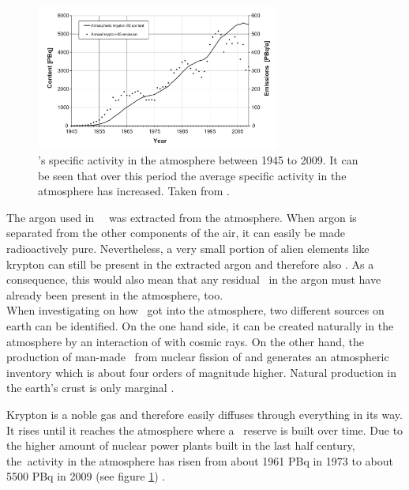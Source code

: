 \documentclass[encoding=utf8,british]{tumphthesis}
\begin{document}
\begin{figure}[t!]
	\centering
	\ifmakefigures%
	\includegraphics[width=80mm]{./Bilder/Kr85Aenderung.png}
	\fi%
	\caption{
	    \Kr's specific activity in the atmosphere between 1945 to 2009. It can be seen that over this period the average specific activity in the atmosphere has increased. 
		Taken from \cite{ahlswede_update_2013}.
	}
    \label{fig:Kr85Aenderung}
    
\end{figure}

The argon used in \gerda\ \PII\ was extracted from the atmosphere.
When argon is separated from the other components of the air, it can easily be made radioactively pure.
Nevertheless, a very small portion of alien elements like krypton can still be present in the extracted argon and therefore also \Kr.  
As a consequence, this would also mean that any residual \Kr\ in the argon must have already been present in the atmosphere, too.
\\

When investigating on how  \Kr\ got into the atmosphere, two different sources on earth can be identified.
On the one hand side, it can be created naturally in the atmosphere by an interaction of  with cosmic rays.
On the other hand, the production of man-made \Kr\ from nuclear fission of  and  generates an atmospheric inventory which is about four orders of magnitude higher.
Natural production in the earth's crust is only marginal \cite{winger_new_2005}.

Krypton is a noble gas and therefore easily diffuses through everything in its way.
It rises until it reaches the atmosphere where a \Kr\ reserve is built over time.  
Due to the higher amount of nuclear power plants built in the last half century, the\Kr\ activity in the atmosphere has risen from about 1961 PBq in 1973 \cite{telegadas_atmospheric_1975} to about 5500 PBq in 2009 (see figure \ref{fig:Kr85Aenderung}) \cite{ahlswede_update_2013}.
\\
\end{document}
